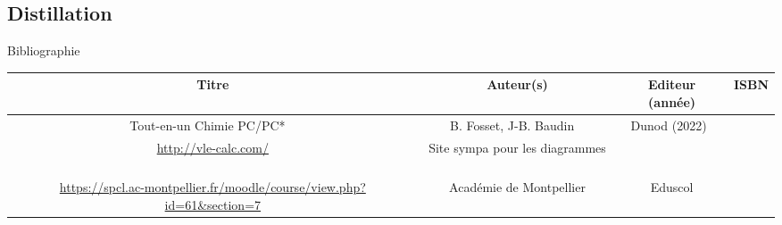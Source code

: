 \begin{headerBlock}
\chapter{Distillation}
    \label{LC_Distillation}
\end{headerBlock}




\begin{reportBlock}{Bibliographie}

\begin{center}
\begin{tabular}{|c|c|c|c|}\hline
Titre & Auteur(s) & Editeur (année) & ISBN \\ \hline
Tout-en-un Chimie PC/PC* ~ & B. Fosset, J-B. Baudin  ~ & Dunod (2022)~ & ~ \\
\hline 
\url{http://vle-calc.com/} & Site sympa pour les diagrammes ~ &  ~ & ~ \\
\hline
\url{https://spcl.ac-montpellier.fr/moodle/course/view.php?id=61&section=7} & Académie de Montpellier & Eduscol & ~ \\ \hline
\end{tabular}
\end{center}

\end{reportBlock}

